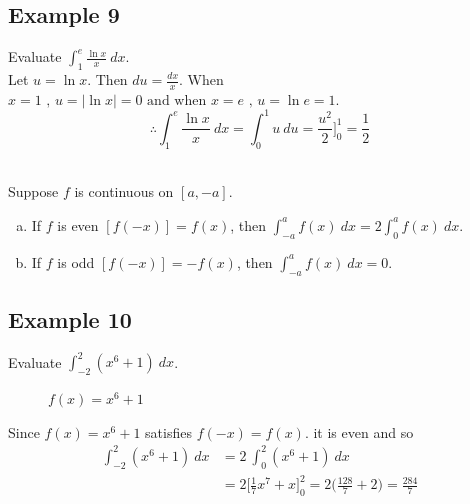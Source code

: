 \documentclass[11pt]{article}
\begin{document}
\subsection{Example 9}
Evaluate $ \displaystyle{\int_{1}^{e}\frac{\ln x}{x}\ dx} $.
\\[8pt]
Let $ u=\ln x $. Then $ du=\frac{dx}{x} $. When $ x=1\text{ , }u=|\ln x|=0\text{ and when }x=e\text{ , }u=\ln e=1 $.
\[
    \therefore \int_{1}^{e}\frac{\ln x}{x}\ dx = \int_{0}^{1}u\ du = \frac{u^2}{2}\bigg]_0^1 = \frac{1}{2}
\]
\\[20pt]
\begin{theo}
    Suppose $ f $ is continuous on $ [a,-a] $.
    \begin{enumerate}[a)]
        \item If $ f $ is even $ [f(-x)] = f(x) $, then $ \int_{-a}^{a}f(x)\ dx = 2 \int_{0}^{a}f(x)\ dx $.
        \item If $ f $ is odd $ [f(-x)] = -f(x) $, then $ \int_{-a}^{a}f(x)\ dx = 0 $.
    \end{enumerate}
\end{theo}
\subsection{Example 10}
Evaluate $ \displaystyle{\int_{-2}^{2}(x^6+1)\ dx} $.\\
\begin{figure}[h]
    \centering
    \caption{$ f(x)=x^6+1 $}
    \label{Label}
\end{figure}

\noindent
Since $ f(x)=x^6+1 $ satisfies $ f(-x)=f(x) $. it is even and so
\begin{align*}
    \int_{-2}^{2}(x^6+1)\ dx
    &= 2\ \int_{0}^{2}(x^6+1)\ dx\\
    &= 2\bigg[ \frac{1}{7}x^7 + x\bigg]_0^2
    =  2\bigg(\frac{128}{7}+2\bigg)
    =  \frac{284}{7}
\end{align*}
\end{document}
